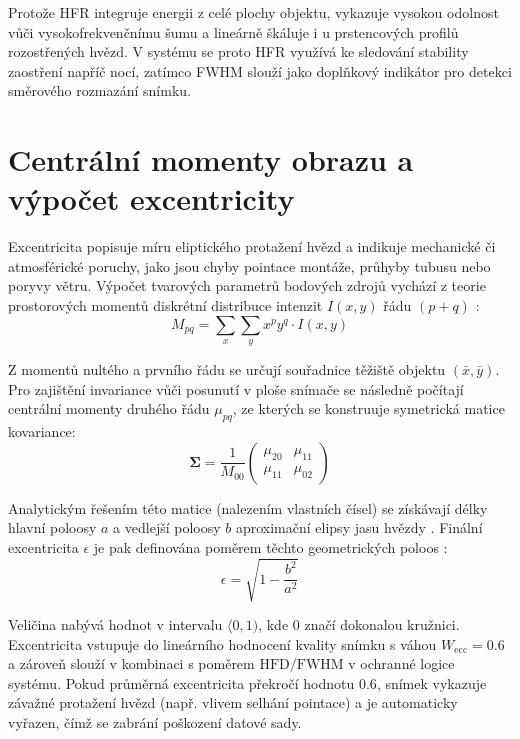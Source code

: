 Protože \ac{HFR} integruje energii z celé plochy objektu, vykazuje vysokou odolnost vůči vysokofrekvenčnímu šumu a lineárně škáluje i u prstencových profilů rozostřených hvězd. V systému se proto \ac{HFR} využívá ke sledování stability zaostření napříč nocí, zatímco \ac{FWHM} slouží jako doplňkový indikátor pro detekci směrového rozmazání snímku.

\section{Centrální momenty obrazu a výpočet excentricity}
Excentricita popisuje míru eliptického protažení hvězd a indikuje mechanické či atmosférické poruchy, jako jsou chyby pointace montáže, průhyby tubusu nebo poryvy větru. Výpočet tvarových parametrů bodových zdrojů vychází z teorie prostorových momentů diskrétní distribuce intenzit $I(x, y)$ řádu $(p+q)$ \cite{popowicz}:
\begin{equation}
M_{pq} = \sum_{x} \sum_{y} x^p y^q \cdot I(x, y)
\end{equation}

Z momentů nultého a prvního řádu se určují souřadnice těžiště objektu $(\bar{x}, \bar{y})$. Pro zajištění invariance vůči posunutí v ploše snímače se následně počítají centrální momenty druhého řádu $\mu_{pq}$, ze kterých se konstruuje symetrická matice kovariance:
\begin{equation}
\mathbf{\Sigma} = \frac{1}{M_{00}} \begin{pmatrix} \mu_{20} & \mu_{11} \\ \mu_{11} & \mu_{02} \end{pmatrix}
\end{equation}

Analytickým řešením této matice (nalezením vlastních čísel) se získávají délky hlavní poloosy $a$ a vedlejší poloosy $b$ aproximační elipsy jasu hvězdy \cite{sextractor}. Finální excentricita $\epsilon$ je pak definována poměrem těchto geometrických poloos \cite{sextractor}:
\begin{equation}
\epsilon = \sqrt{1 - \frac{b^2}{a^2}}
\end{equation}


Veličina nabývá hodnot v intervalu $\langle 0, 1)$, kde $0$ značí dokonalou kružnici. Excentricita vstupuje do lineárního hodnocení kvality snímku s váhou $W_{\text{ecc}} = 0.6$ a zároveň slouží v kombinaci s poměrem $\text{HFD}/\text{FWHM}$ v ochranné logice systému. Pokud průměrná excentricita překročí hodnotu $0.6$, snímek vykazuje závažné protažení hvězd (např. vlivem selhání pointace) a je automaticky vyřazen, čímž se zabrání poškození datové sady.

